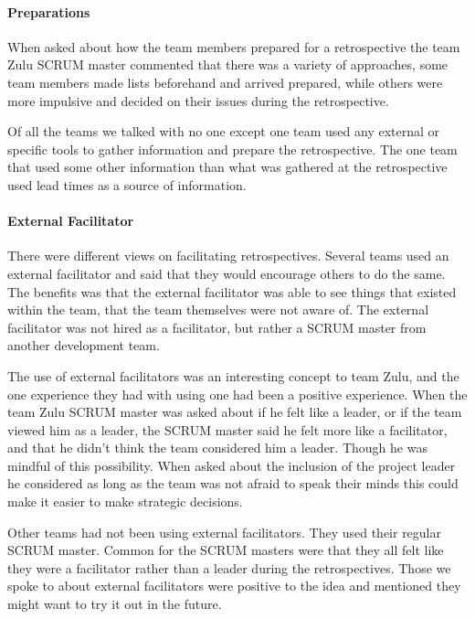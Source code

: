 \paragraph{Preparations}
When asked about how the team members prepared for a retrospective the team Zulu SCRUM master commented that there was a variety of approaches, some team members made lists beforehand and arrived prepared, while others were more impulsive and decided on their issues during the retrospective.

\label{question-12}
Of all the teams we talked with no one except one team used any external or specific tools to gather information and prepare the retrospective. The one team that used some other information than what was gathered at the retrospective used lead times as a source of information. 

\paragraph{External Facilitator}
There were different views on facilitating retrospectives. Several teams used an external facilitator and said that they would encourage others to do the same. The benefits was that the external facilitator was able to see things that existed within the team, that the team themselves were not aware of. The external facilitator was not hired as a facilitator, but rather a SCRUM master from another development team.

The use of external facilitators was an interesting concept to team Zulu, and the one experience they had with using one had been a positive experience. When the team Zulu SCRUM master was asked about if he felt like a leader, or if the team viewed him as a leader, the SCRUM master said he felt more like a facilitator, and that he didn't think the team considered him a leader. Though he was mindful of this possibility. When asked about the inclusion of the project leader he considered as long as the team was not afraid to speak their minds this could make it easier to make strategic decisions.

Other teams had not been using external facilitators. They used their regular SCRUM master. Common for the SCRUM masters were that they all felt like they were a facilitator rather than a leader during the retrospectives. Those we spoke to about external facilitators were positive to the idea and mentioned they might want to try it out in the future. 

\begin{table}[!h]
	\begin{center}
	\caption{Usage of external facilitator}
	\label{table:external-facilitator}
	\end{center}
\end{table}

